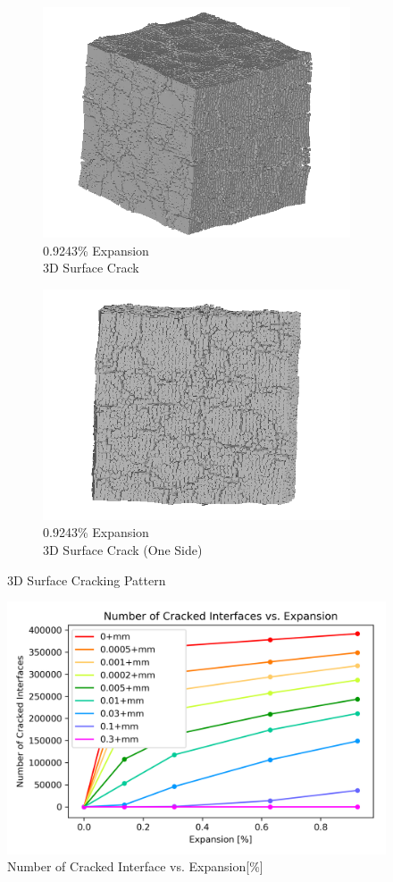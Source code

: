 \begin{figure}[ht!]
    \begin{subfigure}{.5\textwidth}
      \centering
      \includegraphics[width=0.5\linewidth]{Files/exp_3D/ASR/A30P75_5_3d.png}
      \caption{0.9243\% Expansion\\3D Surface Crack}
    \end{subfigure}%
    \begin{subfigure}{.5\textwidth}
      \centering
      \includegraphics[width=0.5\linewidth]{Files/exp_3D/ASR/A30P75_5_3ds.png}
      \caption{0.9243\% Expansion\\3D Surface Crack (One Side)}
    \end{subfigure}%

\caption{3D Surface Cracking Pattern}
\label{fig:A15_3Dcrack}
\end{figure}

\begin{figure}[ht!]
\centering
\includegraphics[width=.8\linewidth]{Files/interface/A15P75CRACK.png}
  \caption{Number of Cracked Interface vs. Expansion[\%]}
  \label{A15P75CRACK}
\end{figure}
